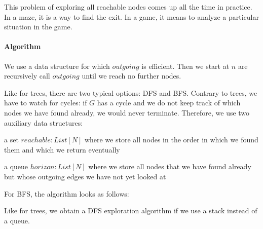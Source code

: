 This problem of exploring all reachable nodes comes up all the time in practice.
In a maze, it is a way to find the exit.
In a game, it means to analyze a particular situation in the game.

\paragraph{Algorithm}
We use a data structure for which $outgoing$ is efficient.
Then we start at $n$ are recursively call $outgoing$ until we reach no further nodes.

Like for trees, there are two typical options: DFS and BFS.
Contrary to trees, we have to watch for cycles: if $G$ has a cycle and we do not keep track of which nodes we have found already, we would never terminate.
Therefore, we use two auxiliary data structures:
\begin{compactitem}
 \item a set $reachable:List[N]$ where we store all nodes in the order in which we found them and which we return eventually
 \item a queue $horizon:List[N]$ where we store all nodes that we have found already but whose outgoing edges we have not yet looked at
\end{compactitem}

For BFS, the algorithm looks as follows:

\begin{acode}
\end{acode}

Like for trees, we obtain a DFS exploration algorithm if we use a stack instead of a queue.

